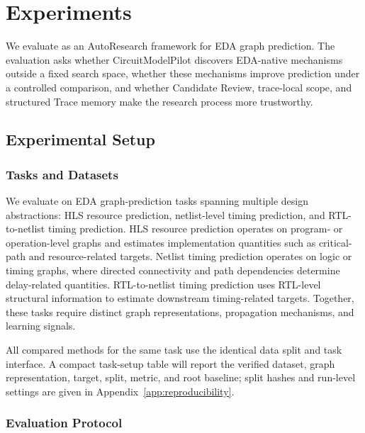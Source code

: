 \section{Experiments}
\label{exp}

We evaluate \sysname as an AutoResearch framework for EDA graph prediction. The evaluation asks whether CircuitModelPilot discovers EDA-native mechanisms outside a fixed search space, whether these mechanisms improve prediction under a controlled comparison, and whether Candidate Review, trace-local scope, and structured Trace memory make the research process more trustworthy.

\subsection{Experimental Setup}
\label{sec:exp_setup}

\subsubsection{Tasks and Datasets}
\label{sec:tasks_datasets}

We evaluate \sysname on EDA graph-prediction tasks spanning multiple design abstractions: HLS resource prediction, netlist-level timing prediction, and RTL-to-netlist timing prediction. HLS resource prediction operates on program- or operation-level graphs and estimates implementation quantities such as critical-path and resource-related targets. Netlist timing prediction operates on logic or timing graphs, where directed connectivity and path dependencies determine delay-related quantities. RTL-to-netlist timing prediction uses RTL-level structural information to estimate downstream timing-related targets. Together, these tasks require distinct graph representations, propagation mechanisms, and learning signals.

All compared methods for the same task use the identical data split and task interface. A compact task-setup table will report the verified dataset, graph representation, target, split, metric, and root baseline; split hashes and run-level settings are given in Appendix~\ref{app:reproducibility}.


\subsubsection{Evaluation Protocol}
\label{sec:evaluation_protocol}

